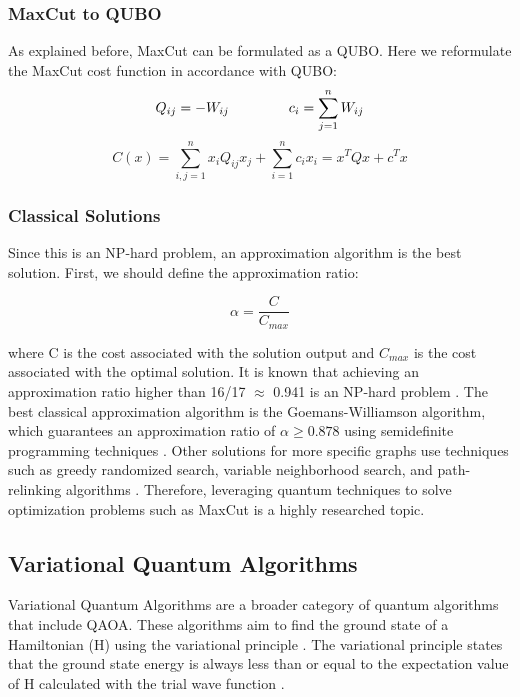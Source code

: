 \subsubsection{MaxCut to QUBO}
As explained before, MaxCut can be formulated as a QUBO. Here we reformulate the MaxCut cost function in accordance with QUBO:
\vspace{-2mm}
\begin{equation} 
        Q_{ij} = -W_{ij} \hspace{1.5cm} c_i = \sum_{j=1}^{n} W_{ij} 
    \end{equation}
\vspace{-2mm}
    \begin{equation} 
        C(x) = \sum_{i,j=1}^{n} x_i Q_{ij} x_j + \sum_{i=1}^{n} c_i x_i = x^T Q x + c^T x 
    \end{equation}

\subsubsection{Classical Solutions}
Since this is an NP-hard problem, an approximation algorithm is the best solution. First, we should define the approximation ratio:

\begin{equation} 
        \alpha = \frac{C}{C_{max}}
    \end{equation}

where C is the cost associated with the solution output and $C_{max}$ is the cost associated with the optimal solution. It is known that achieving an approximation ratio higher than 16/17 $\approx$ 0.941 is an NP-hard problem \cite{hastad2001}. The best classical approximation algorithm is the Goemans-Williamson algorithm, which guarantees an approximation ratio of $\alpha \geq 0.878$ using semidefinite programming techniques \cite{GWalgorithm}. Other solutions for more specific graphs use techniques such as greedy randomized search, variable neighborhood search, and path-relinking algorithms \cite{GWalgorithm}. Therefore, leveraging quantum techniques to solve optimization problems such as MaxCut is a highly researched topic.

\subsection{Variational Quantum Algorithms}
Variational Quantum Algorithms are a broader category of quantum algorithms that include QAOA. These algorithms aim to find the ground state of a Hamiltonian (H) using the variational principle \cite{vqa2021}. The variational principle states that the ground state energy is always less than or equal to the expectation value of H calculated with the trial wave function \cite{vqa2021}.

